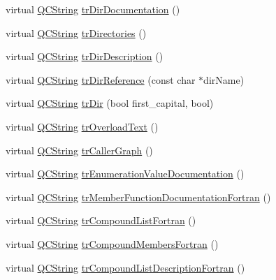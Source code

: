 \begin{DoxyCompactItemize}
virtual \mbox{\hyperlink{class_q_c_string}{Q\+C\+String}} \mbox{\hyperlink{class_translator_italian_a9971144c072666795909e3b0bcfcb428}{tr\+Dir\+Documentation}} ()
\item 
virtual \mbox{\hyperlink{class_q_c_string}{Q\+C\+String}} \mbox{\hyperlink{class_translator_italian_a04426c318141a14fadc21657a8a40e43}{tr\+Directories}} ()
\item 
virtual \mbox{\hyperlink{class_q_c_string}{Q\+C\+String}} \mbox{\hyperlink{class_translator_italian_a6975756ad0c915166e8ae3b10406c65f}{tr\+Dir\+Description}} ()
\item 
virtual \mbox{\hyperlink{class_q_c_string}{Q\+C\+String}} \mbox{\hyperlink{class_translator_italian_a79749b27a77fa727e3935f1a992cc02b}{tr\+Dir\+Reference}} (const char $\ast$dir\+Name)
\item 
virtual \mbox{\hyperlink{class_q_c_string}{Q\+C\+String}} \mbox{\hyperlink{class_translator_italian_a419b502c4fc1c36dcda3fc0bd1bd6a33}{tr\+Dir}} (bool first\+\_\+capital, bool)
\item 
virtual \mbox{\hyperlink{class_q_c_string}{Q\+C\+String}} \mbox{\hyperlink{class_translator_italian_a13707f53da74bddea1e2a365e3c381e0}{tr\+Overload\+Text}} ()
\item 
virtual \mbox{\hyperlink{class_q_c_string}{Q\+C\+String}} \mbox{\hyperlink{class_translator_italian_aa203560a69ac79dea8736cc4b77e217d}{tr\+Caller\+Graph}} ()
\item 
virtual \mbox{\hyperlink{class_q_c_string}{Q\+C\+String}} \mbox{\hyperlink{class_translator_italian_a7988405bff5d4d2e991928eae3403dc9}{tr\+Enumeration\+Value\+Documentation}} ()
\item 
virtual \mbox{\hyperlink{class_q_c_string}{Q\+C\+String}} \mbox{\hyperlink{class_translator_italian_a328b5e0aa818391336e3cd8dcaef3420}{tr\+Member\+Function\+Documentation\+Fortran}} ()
\item 
virtual \mbox{\hyperlink{class_q_c_string}{Q\+C\+String}} \mbox{\hyperlink{class_translator_italian_ac19386644a5f5f99a5ebcf86bf3a2223}{tr\+Compound\+List\+Fortran}} ()
\item 
virtual \mbox{\hyperlink{class_q_c_string}{Q\+C\+String}} \mbox{\hyperlink{class_translator_italian_acab289997cda5bb70b87379b990eb038}{tr\+Compound\+Members\+Fortran}} ()
\item 
virtual \mbox{\hyperlink{class_q_c_string}{Q\+C\+String}} \mbox{\hyperlink{class_translator_italian_a9c602fe1e41edc84b37a94cec44145a3}{tr\+Compound\+List\+Description\+Fortran}} ()
\item 

\end{DoxyCompactItemize}
